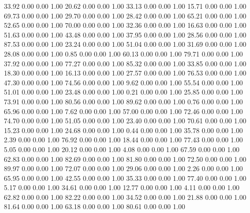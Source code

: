    33.92   0.00   0.00   1.00
   20.62   0.00   0.00   1.00
   33.13   0.00   0.00   1.00
   15.71   0.00   0.00   1.00
   69.73   0.00   0.00   1.00
   29.70   0.00   0.00   1.00
   28.42   0.00   0.00   1.00
   65.21   0.00   0.00   1.00
   52.65   0.00   0.00   1.00
   70.00   0.00   0.00   1.00
   32.36   0.00   0.00   1.00
   16.63   0.00   0.00   1.00
   51.63   0.00   0.00   1.00
   43.48   0.00   0.00   1.00
   37.95   0.00   0.00   1.00
   28.56   0.00   0.00   1.00
   87.53   0.00   0.00   1.00
   23.24   0.00   0.00   1.00
   51.04   0.00   0.00   1.00
   31.69   0.00   0.00   1.00
   28.08   0.00   0.00   1.00
    0.85   0.00   0.00   1.00
   60.13   0.00   0.00   1.00
   79.71   0.00   0.00   1.00
   37.92   0.00   0.00   1.00
   77.27   0.00   0.00   1.00
   85.32   0.00   0.00   1.00
   33.85   0.00   0.00   1.00
   18.30   0.00   0.00   1.00
   16.13   0.00   0.00   1.00
   27.57   0.00   0.00   1.00
   76.53   0.00   0.00   1.00
   47.30   0.00   0.00   1.00
   74.56   0.00   0.00   1.00
    9.62   0.00   0.00   1.00
   55.54   0.00   0.00   1.00
   51.01   0.00   0.00   1.00
   23.48   0.00   0.00   1.00
    0.21   0.00   0.00   1.00
   25.85   0.00   0.00   1.00
   73.91   0.00   0.00   1.00
   80.56   0.00   0.00   1.00
   89.62   0.00   0.00   1.00
    0.76   0.00   0.00   1.00
   65.96   0.00   0.00   1.00
    7.62   0.00   0.00   1.00
   57.00   0.00   0.00   1.00
   72.46   0.00   0.00   1.00
   74.70   0.00   0.00   1.00
   51.05   0.00   0.00   1.00
   23.40   0.00   0.00   1.00
   70.61   0.00   0.00   1.00
   15.23   0.00   0.00   1.00
   24.68   0.00   0.00   1.00
    0.44   0.00   0.00   1.00
   35.78   0.00   0.00   1.00
    2.39   0.00   0.00   1.00
   76.92   0.00   0.00   1.00
   18.44   0.00   0.00   1.00
   77.43   0.00   0.00   1.00
    5.05   0.00   0.00   1.00
   20.12   0.00   0.00   1.00
    4.08   0.00   0.00   1.00
   67.59   0.00   0.00   1.00
   62.83   0.00   0.00   1.00
   82.69   0.00   0.00   1.00
   81.80   0.00   0.00   1.00
   72.50   0.00   0.00   1.00
   89.97   0.00   0.00   1.00
   72.07   0.00   0.00   1.00
   29.06   0.00   0.00   1.00
    2.26   0.00   0.00   1.00
   65.95   0.00   0.00   1.00
   42.55   0.00   0.00   1.00
   35.33   0.00   0.00   1.00
   77.40   0.00   0.00   1.00
    5.17   0.00   0.00   1.00
   34.61   0.00   0.00   1.00
   12.77   0.00   0.00   1.00
    4.11   0.00   0.00   1.00
   62.82   0.00   0.00   1.00
   82.22   0.00   0.00   1.00
   34.52   0.00   0.00   1.00
   21.88   0.00   0.00   1.00
   81.64   0.00   0.00   1.00
   63.18   0.00   0.00   1.00
   80.61   0.00   0.00   1.00
